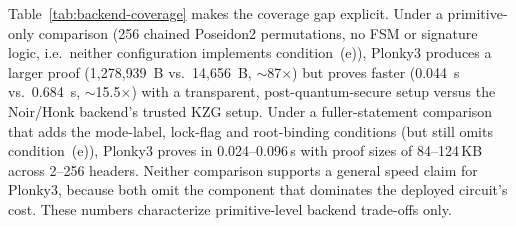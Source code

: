 Table~\ref{tab:backend-coverage} makes the coverage gap explicit. Under a
primitive-only comparison (256 chained Poseidon2 permutations, no FSM or
signature logic, i.e.\ neither configuration implements condition~(e)),
Plonky3 produces a larger proof (1{,}278{,}939~B vs.\
14{,}656~B, $\sim$87$\times$) but proves faster (0.044~s vs.\ 0.684~s,
$\sim$15.5$\times$) with a transparent, post-quantum-secure setup versus the
Noir/Honk backend's trusted KZG setup. Under a fuller-statement comparison
that adds the mode-label, lock-flag and root-binding conditions (but still omits condition~(e)),
Plonky3 proves in 0.024--0.096\,s with proof sizes of 84--124\,KB across
2--256 headers. Neither comparison supports a general speed claim for Plonky3, because
both omit the component that dominates the deployed circuit's cost. These
numbers characterize primitive-level backend trade-offs only.

\FloatBarrier
